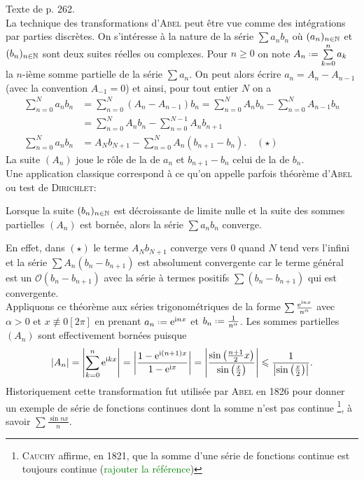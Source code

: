 Texte de \cite{oraux_x_ens_3} p. 262. \\

La technique des transformations d'\textsc{Abel} peut être vue comme des intégrations par parties discrètes. On s'intéresse à la nature de la série $\sum a_n b_n$ où $(a_n)_{n \in \mathbb{N}}$ et $(b_n)_{n \in \mathbb{N}}$ sont deux suites réelles ou complexes. Pour $n \geqslant 0$ on note $A_n \defeq \sum\limits_{k=0}^n a_k$ la $n$-ième somme partielle de la série $\sum a_n$. On peut alors écrire $a_n = A_n - A_{n-1}$ (avec la convention $A_{-1} = 0$) et ainsi, pour tout entier $N$ on a
\begin{align*}
    \sum_{n=0}^N a_n b_n &= \sum_{n=0}^N (A_n - A_{n-1})b_n =  \sum_{n=0}^N A_n b_n -  \sum_{n=0}^N A_{n-1}b_n \\
    &= \sum_{n=0}^N A_n b_n - \sum_{n=0}^{N-1} A_n b_{n+1} \\
    \sum_{n=0}^N a_n b_n &= A_N b_{N+1} - \sum_{n=0}^N A_n(b_{n+1}-b_n). \quad (\star)
\end{align*}
La suite $(A_n)$ joue le rôle de la  de $a_n$ et $b_{n+1} - b_n$ celui de la  de $b_n$. \\
Une application classique correspond à ce qu'on appelle parfois théorème d'\textsc{Abel} ou test de \textsc{Dirichlet}: 
\begin{theo}
    Lorsque la suite $(b_n)_{n \in \mathbb{N}}$ est décroissante de limite nulle et la suite des sommes partielles $(A_n)$ est bornée, alors la série $\sum a_n b_n$ converge. 
\end{theo}

En effet, dans $(\star)$ le terme $A_N b_{N+1}$ converge vers $0$ quand $N$ tend vers l'infini et la série $\sum A_n(b_n - b_{n+1})$ est absolument convergente car le terme général est un $\mathcal{O}(b_n - b_{n+1})$ avec la série à termes positifs $\sum(b_n - b_{n+1})$ qui est convergente. \\
Appliquons ce théorème aux séries trigonométriques de la forme $\sum \frac{\mathrm{e}^{\mathrm{i} n x}}{n^\alpha}$ avec $\alpha > 0$ et $x \not \equiv 0 [2\pi]$ en prenant $a_n \defeq \me^{\mi n x}$ et $b_n \defeq \frac{1}{n^\alpha}$. Les sommes partielles $(A_n)$ sont effectivement bornées puisque
$$|A_n| = \left| \sum_{k=0}^n \mathrm{e}^{\mathrm{i} k x}\right| = \left| \frac{1 - \mathrm{e}^{\mathrm{i} (n+1)x}}{1-\mathrm{e}^{\mathrm{i} x}} \right| = \left| \frac{\sin \left( \frac{n+1}{2} x\right)}{\sin \left( \frac{x}{2} \right)} \right| \leqslant \frac{1}{\left| \sin \left( \frac{x}{2} \right) \right|}.$$
Historiquement cette transformation fut utilisée par \textsc{Abel} en 1826 pour donner un exemple de série de fonctions continues dont la somme n'est pas continue \footnote{\textsc{Cauchy} affirme, en 1821, que la somme d'une série de fonctions continue est toujours continue (\textcolor{green}{rajouter la référence})}, à savoir $\sum \frac{\sin nx}{n}$.
